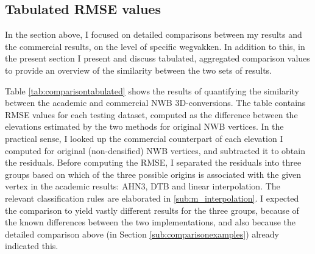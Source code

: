 \subsection{Tabulated RMSE values}
\label{sub:comparisontabulated}

In the section above, I focused on detailed comparisons between my results and the commercial results, on the level of specific wegvakken. In addition to this, in the present section I present and discuss tabulated, aggregated comparison values to provide an overview of the similarity between the two sets of results.

\begin{table}
    \caption{Tabulated academic and commercial 3D-NWB similarity quantification results \label{tab:comparisontabulated}.}
\end{table}

Table \ref{tab:comparisontabulated} shows the results of quantifying the similarity between the academic and commercial NWB 3D-conversions. The table contains RMSE values for each testing dataset, computed as the difference between the elevations estimated by the two methods for original NWB vertices. In the practical sense, I looked up the commercial counterpart of each elevation I computed for original (non-densified) NWB vertices, and subtracted it to obtain the residuals. Before computing the RMSE, I separated the residuals into three groups based on which of the three possible origins is associated with the given vertex in the academic results: AHN3, DTB and linear interpolation. The relevant classification rules are elaborated in \ref{sub:m_interpolation}. I expected the comparison to yield vastly different results for the three groups, because of the known differences between the two implementations, and also because the detailed comparison above (in Section \ref{sub:comparisonexamples}) already indicated this.

